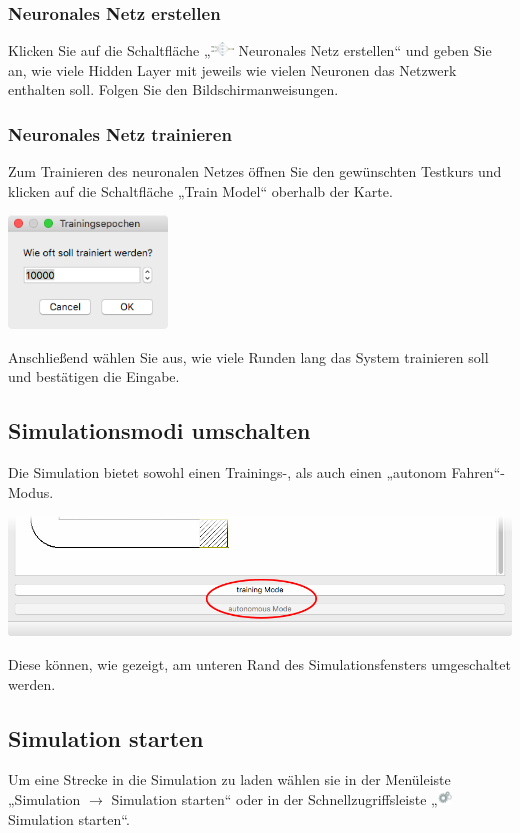 \documentclass[11pt,a4paper]{article}
\begin{document}
\subsubsection{Neuronales Netz erstellen}
Klicken Sie auf die Schaltfläche „\includegraphics[height=11pt]{icon/create_Neural_network} Neuronales Netz erstellen“ und geben Sie an, wie viele Hidden Layer mit jeweils wie vielen Neuronen das Netzwerk enthalten soll. Folgen Sie den Bildschirmanweisungen.


\subsubsection{Neuronales Netz trainieren}
Zum Trainieren des neuronalen Netzes öffnen Sie den gewünschten Testkurs und klicken auf die Schaltfläche „Train Model“ oberhalb der Karte.
\begin{center}
	\includegraphics[width=120pt]{s5}
\end{center}
Anschließend wählen Sie aus, wie viele Runden lang das System trainieren soll und bestätigen die Eingabe.

\subsection{Simulationsmodi umschalten}
Die Simulation bietet sowohl einen Trainings-, als auch einen „autonom Fahren“-Modus.

\begin{center}
	\includegraphics[width=\textwidth]{s6}
\end{center}

Diese können, wie gezeigt, am unteren Rand des Simulationsfensters umgeschaltet werden. 

\subsection{Simulation starten}
Um eine Strecke in die Simulation zu laden wählen sie in der Menüleiste „Simulation $\rightarrow$ Simulation starten“ oder in der Schnellzugriffsleiste „\includegraphics[height=11pt]{icon/run} Simulation starten“. %
\end{document}
